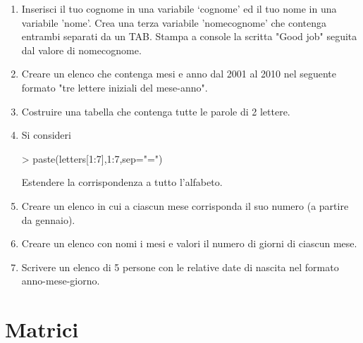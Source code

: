 \documentclass[onecolumn,12pt]{book}
\begin{document}
 \begin{shaded}
 \begin{enumerate}
 \item{} Inserisci il tuo cognome in una variabile `cognome' ed il tuo nome in una variabile 'nome'. Crea una terza variabile 'nomecognome' che contenga entrambi separati da un TAB. Stampa a console la scritta "Good job" seguita dal valore di nomecognome.
  \item{} Creare un elenco che contenga mesi e anno dal 2001 al 2010 nel seguente formato "tre lettere iniziali del mese-anno".
 \item{} Costruire una tabella che contenga tutte le parole di 2 lettere.
\item{}
Si consideri
\begin{Schunk}
\begin{Sinput}
> paste(letters[1:7],1:7,sep="=")
\end{Sinput}
\end{Schunk}
Estendere la corrispondenza a tutto l'alfabeto.
\item Creare un elenco in cui a ciascun mese corrisponda il suo numero (a partire da gennaio).
\item Creare un elenco con nomi i mesi e valori il numero di giorni di ciascun mese.
\item Scrivere un elenco di 5 persone con le relative date di nascita nel formato anno-mese-giorno.
 \end{enumerate}
 \end{shaded}

\section{Matrici}
\end{document}
